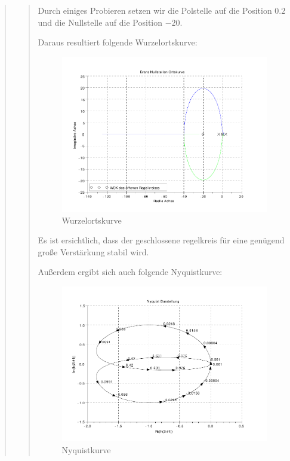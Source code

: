 \begin{quote}
\begin{quote}
        Durch einiges Probieren setzen wir die Polstelle auf die Position $0.2$ und die Nullstelle auf die Position
        $-20$.
        
        Daraus resultiert folgende Wurzelortskurve:
        
        \begin{figure}[H]
        \centering
            \includegraphics[scale=0.7, trim = 0cm 0cm 0cm 0cm, clip]{./Bilder/WOK}
                \caption{Wurzelortskurve}
        \end{figure}
        
        Es ist ersichtlich, dass der geschlossene regelkreis für eine genügend große Verstärkung stabil
        wird.\vspace{1em}
        
        Außerdem ergibt sich auch folgende Nyquistkurve:
        
        \begin{figure}[H]
        \centering
            \includegraphics[scale=0.7, trim = 0cm 0cm 0cm 0cm, clip]{./Bilder/Nyquistkurve}
                \caption{Nyquistkurve}
        \end{figure}
        

\end{quote}
\end{quote}
